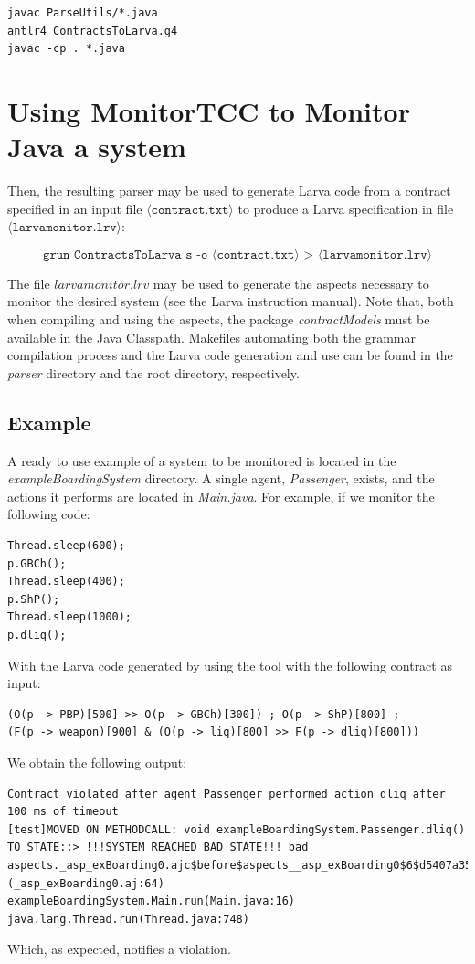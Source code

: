 \documentclass{article}
\begin{document}
\begin{verbatim}
javac ParseUtils/*.java
antlr4 ContractsToLarva.g4
javac -cp . *.java
\end{verbatim}

\section{Using MonitorTCC to Monitor Java a system}

Then, the resulting parser may be used to generate Larva code from a contract specified in an input file $\langle\texttt{contract.txt}\rangle$ to produce a Larva specification in file $\langle\texttt{larvamonitor.lrv}\rangle$:

\[
\texttt{grun ContractsToLarva s -o }\langle\texttt{contract.txt}\rangle\texttt{ > }\langle\texttt{larvamonitor.lrv}\rangle
\]

The file \textit{$larvamonitor.lrv$} may be used to generate the aspects necessary to monitor the desired system (see the Larva instruction manual). Note that, both when compiling and using the aspects, the package \textit{contractModels} must be available in the Java Classpath. Makefiles automating both the grammar compilation process and the Larva code generation and use can be found in the \textit{parser} directory and the root directory, respectively.

\subsection{Example}
A ready to use example of a system to be monitored is located in the \textit{exampleBoardingSystem} directory. A single agent, \textit{Passenger}, exists, and the actions it performs are located in \textit{Main.java}. For example, if we monitor the following code:

\begin{verbatim}
Thread.sleep(600);
p.GBCh();
Thread.sleep(400);
p.ShP();
Thread.sleep(1000);
p.dliq();
\end{verbatim}

With the Larva code generated by using the tool with the following contract as input:

\begin{verbatim}
(O(p -> PBP)[500] >> O(p -> GBCh)[300]) ; O(p -> ShP)[800] ; 
(F(p -> weapon)[900] & (O(p -> liq)[800] >> F(p -> dliq)[800]))
\end{verbatim}

We obtain the following output:

\begin{verbatim}
Contract violated after agent Passenger performed action dliq after 
100 ms of timeout
[test]MOVED ON METHODCALL: void exampleBoardingSystem.Passenger.dliq() 
TO STATE::> !!!SYSTEM REACHED BAD STATE!!! bad
aspects._asp_exBoarding0.ajc$before$aspects__asp_exBoarding0$6$d5407a35
(_asp_exBoarding0.aj:64)
exampleBoardingSystem.Main.run(Main.java:16)
java.lang.Thread.run(Thread.java:748) 
\end{verbatim}

Which, as expected, notifies a violation.



\end{document}
